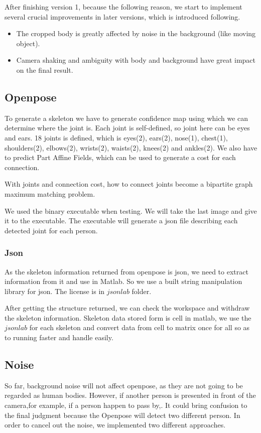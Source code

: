 \documentclass[11pt,twocolumn,letterpaper]{article}
\begin{document}
		\par
		After finishing version 1, because the following reason, we start to implement several crucial improvements in later versions, which is introduced following.
		\begin{itemize}
		\item The cropped body is greatly affected by noise in the background (like moving object). 
		\item Camera shaking and ambiguity with body and background have great impact on the final result.
		\end{itemize}
	\subsection{Openpose\cite{cao2017realtime}}
	    \par To generate a skeleton we have to generate confidence map using which we can determine where the joint is.
		Each joint is self-defined, so joint here can be eyes and ears.
		18 joints is defined, which is eyes(2), ears(2), nose(1), chest(1), shoulders(2), elbows(2), wrists(2), waists(2), knees(2) and ankles(2).
		We also have to predict Part Affine Fields, which can be used to generate a cost for each connection.
		\par With joints and connection cost, how to connect joints become a bipartite graph maximum matching problem.
		\par We used the binary executable\cite{cao2017realtime} when testing. We will take the last image and give it to the executable. The executable will generate a json file describing each detected joint for each person.
	    \subsubsection{Json}
        \par As the skeleton information returned from openpose is json, we need to extract information from it and use in Matlab. So we use a built string manipulation library for json. The license is in $jsonlab$ folder.
        \par After getting the structure returned, we can check the workspace and withdraw the skeleton information. Skeleton data stored form is cell in matlab, we use the $jsonlab$ for each skeleton and convert data from cell to matrix once for all so as to running faster and handle easily.

	\subsection{Noise}
\par
So far, background noise will not affect openpose, as they are not going to be regarded as human bodies. However, if another person is presented in front of the camera,for example, if a person happen to pass by,. It could bring confusion to the final judgment because the Openpose will detect two different person. In order to cancel out the noise, we implemented two different approaches.
\end{document}
